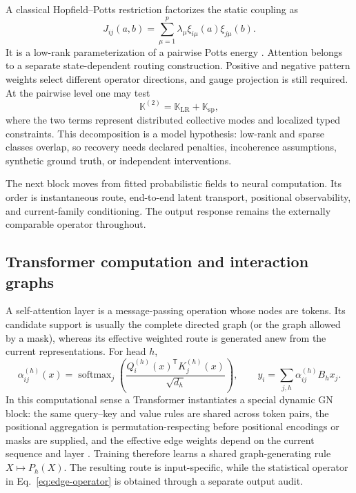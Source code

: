 \documentclass[10pt]{article}
\theoremstyle{definition}
\theoremstyle{remark}
\newcommand{\BookSection}[1]{\subsection{#1}}
\begin{document}
A classical Hopfield--Potts restriction factorizes the static coupling as
\begin{equation}
J_{ij}(a,b)
=\sum_{\mu=1}^{p}\lambda_\mu
\xi_{i\mu}(a)\xi_{j\mu}(b).
\label{eq:hopfield-potts}
\end{equation}
It is a low-rank parameterization of a pairwise Potts energy \cite{hopfield1982,cocco2013}.
Attention belongs to a separate state-dependent routing construction.  Positive and negative pattern weights select different operator
directions, and gauge projection is still required.  At the pairwise level one may test
\begin{equation}
\mathbb K^{(2)}
=\mathbb K_{\mathrm{LR}}+\mathbb K_{\mathrm{sp}},
\label{eq:lowrank-sparse}
\end{equation}
where the two terms represent distributed collective modes and localized typed constraints.  This
decomposition is a model hypothesis: low-rank and sparse classes overlap, so recovery needs
declared penalties, incoherence assumptions, synthetic ground truth, or independent interventions.

\ifdefined\BOOKMODE
The next block moves from fitted probabilistic fields to neural computation.  Its order is
instantaneous route, end-to-end latent transport, positional observability, and current-family
conditioning.  The output response remains the externally comparable operator throughout.
\fi
\BookSection{Transformer computation and interaction graphs}

A self-attention layer is a message-passing operation whose nodes are tokens.  Its candidate
support is usually the complete directed graph (or the graph allowed by a mask), whereas its
effective weighted route is generated anew from the current representations.  For head $h$,
\begin{equation}
\alpha_{ij}^{(h)}(x)
=\operatorname{softmax}_{j}
\left(\frac{Q_i^{(h)}(x)^{\mathsf T}K_j^{(h)}(x)}{\sqrt{d_h}}\right),
\qquad
y_i=\sum_{j,h}\alpha_{ij}^{(h)}B_hx_j.
\label{eq:attention}
\end{equation}
In this computational sense a Transformer instantiates a special dynamic GN block: the same
query--key and value rules are shared across token pairs, the positional aggregation is
permutation-respecting before positional encodings or masks are supplied, and the effective edge
weights depend on the current sequence and layer
\cite{battaglia2018relational,gilmer2017,velickovic2018,vaswani2017}.  Training therefore learns a
shared graph-generating rule $X\mapsto P_h(X)$.  The resulting route is input-specific, while the
statistical operator in Eq.~\ref{eq:edge-operator} is obtained through a separate output audit.
\end{document}
